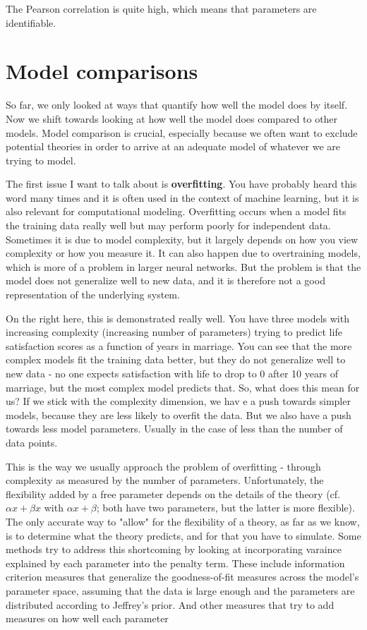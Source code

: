 \documentclass[12pt]{article}
\begin{document}
The Pearson correlation is quite high, which means that parameters are identifiable.

\section{Model comparisons}

So far, we only looked at ways that quantify how well the model does by itself. Now we shift towards looking at how well the model does compared to other models. Model comparison is crucial, especially because we often want to exclude potential theories in order to arrive at an adequate model of whatever we are trying to model.

The first issue I want to talk about is \textbf{overfitting}. You have probably heard this word many times and it is often used in the context of machine learning, but it is also relevant for computational modeling. Overfitting occurs when a model fits the training data really well but may perform poorly for independent data. Sometimes it is due to model complexity, but it largely depends on how you view complexity or how you measure it. It can also happen due to overtraining models, which is more of a problem in larger neural networks. But the problem is that the model does not generalize well to new data, and it is therefore not a good representation of the underlying system.

On the right here, this is demonstrated really well. You have three models with increasing complexity (increasing number of parameters) trying to predict life satisfaction scores as a function of years in marriage. You can see that the more complex models fit the training data better, but they do not generalize well to new data - no one expects satisfaction with life to drop to 0 after 10 years of marriage, but the most complex model predicts that. So, what does this mean for us? If we stick with the complexity dimension, we hav e a push towards simpler models, because they are less likely to overfit the data. But we also have a push towards less model parameters. Usually in the case of less than the number of data points.

This is the way we usually approach the problem of overfitting - through complexity as measured by the number of parameters. Unfortunately, the flexibility added by a free parameter depends on the details of the theory (cf. $\alpha x + \beta x$ with $\alpha x + \beta$; both have two parameters, but the latter is more flexible). The only accurate way to "allow" for the flexibility of a theory, as far as we know, is to determine what the theory predicts, and for that you have to simulate. Some methods try to address this shortcoming by looking at incorporating varaince explained by each parameter into the penalty term. These include information criterion measures that generalize the goodness-of-fit measures across the model's parameter space, assuming that the data is large enough and the parameters are distributed according to Jeffrey's prior. And other measures that try to add measures on how well each parameter 
\end{document}
